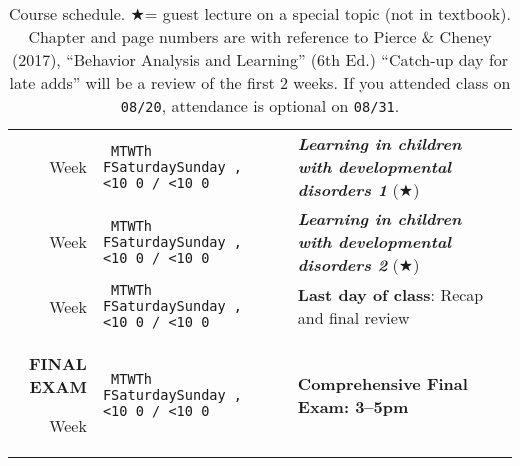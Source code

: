 \documentclass[11pt]{article}
\newcommand{\setdatenextclassMWF}{
	\ifcase\thedatedayname\relax\or
	\addtocounter{datenumber}{2}
	\or\addtocounter{datenumber}{1}
	\or\addtocounter{datenumber}{2}
	\or\addtocounter{datenumber}{1}
	\or\addtocounter{datenumber}{3}
	\or\addtocounter{datenumber}{2}
	\or\addtocounter{datenumber}{1}
	\fi 
	\setdatebynumber{\thedatenumber}
}
\newcommand{\dayabbrev}{%
	\ifcase\thedatedayname \or
	M\or T\or W\or Th\or
	F\or Saturday\or Sunday\fi
}%
\newcommand{\monthday}{%
	\ifnum\value{datemonth}<10 0\fi
	\thedatemonth/%
	\ifnum\value{dateday}<10 0\fi
	\thedateday%
}%
\newcounter{courseweeknumber}
\newcommand{\schedulerow}[3]{
	\ifnum\thedatedayname=1\stepcounter{courseweeknumber}Week \thecourseweeknumber\fi%
	& \texttt{\dayabbrev, \monthday} & #2 & #1 & #3\tabularnewline%
}%
\newcommand{\setdatefinalexam}{\setdate{2018}{12}{5}}
\renewcommand{\star}{$\bigstar$}
\begin{document}
\begin{table}
{\begin{tabular}{rlcll}
		\schedulerow{\textbf{\it Learning in children with developmental disorders 1} (\star)}{}{}
		\setdatenextclassMWF
		
		\schedulerow{\textbf{\it Learning in children with developmental disorders 2} (\star)}{}{}
		\setdatenextclassMWF
		
		\schedulerow{\textbf{Last day of class}: Recap and final review}{}{}
		\setdatefinalexam
		
		\textbf{FINAL EXAM}
		\schedulerow{\textbf{Comprehensive Final Exam: 3--5pm}}{}{}
		\bottomrule
	\end{tabular}}
	\label{table:schedule}
	\caption{Course schedule.
		\star = guest lecture on a special topic (not in textbook).
		Chapter and page numbers are with reference to Pierce \& Cheney (2017), ``Behavior Analysis and Learning'' (6th Ed.)
		``Catch-up day for late adds'' will be a review of the first 2 weeks.
		If you attended class on \texttt{08/20}, attendance is optional on \texttt{08/31}.
	}
\end{table}
\end{document}
